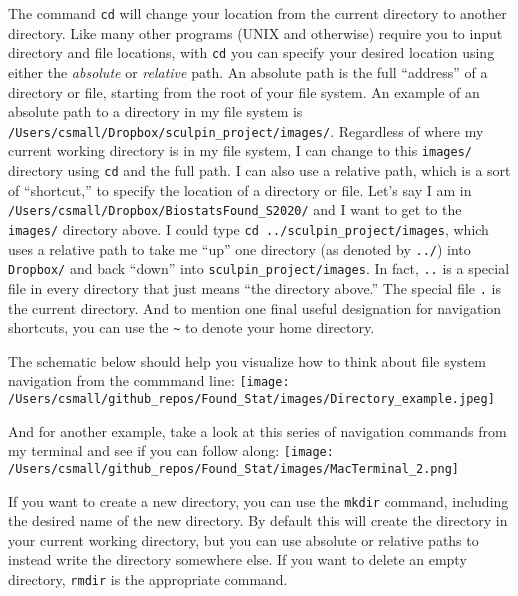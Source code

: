 \documentclass[]{book}
\begin{document}
The command \texttt{cd} will change your location from the current directory to another directory. Like many other programs (UNIX and otherwise) require you to input directory and file locations, with \texttt{cd} you can specify your desired location using either the \emph{absolute} or \emph{relative} path. An absolute path is the full ``address'' of a directory or file, starting from the root of your file system. An example of an absolute path to a directory in my file system is \texttt{/Users/csmall/Dropbox/sculpin\_project/images/}. Regardless of where my current working directory is in my file system, I can change to this \texttt{images/} directory using \texttt{cd} and the full path. I can also use a relative path, which is a sort of ``shortcut,'' to specify the location of a directory or file. Let's say I am in \texttt{/Users/csmall/Dropbox/BiostatsFound\_S2020/} and I want to get to the \texttt{images/} directory above. I could type \texttt{cd\ ../sculpin\_project/images}, which uses a relative path to take me ``up'' one directory (as denoted by \texttt{../}) into \texttt{Dropbox/} and back ``down'' into \texttt{sculpin\_project/images}. In fact, \texttt{..} is a special file in every directory that just means ``the directory above.'' The special file \texttt{.} is the current directory. And to mention one final useful designation for navigation shortcuts, you can use the \texttt{\textasciitilde{}} to denote your home directory.

The schematic below should help you visualize how to think about file system navigation from the commmand line:
\texttt{[image: /Users/csmall/github\_repos/Found\_Stat/images/Directory\_example.jpeg]}

And for another example, take a look at this series of navigation commands from my terminal and see if you can follow along:
\texttt{[image: /Users/csmall/github\_repos/Found\_Stat/images/MacTerminal\_2.png]}

If you want to create a new directory, you can use the \texttt{mkdir} command, including the desired name of the new directory. By default this will create the directory in your current working directory, but you can use absolute or relative paths to instead write the directory somewhere else. If you want to delete an empty directory, \texttt{rmdir} is the appropriate command.
\end{document}
